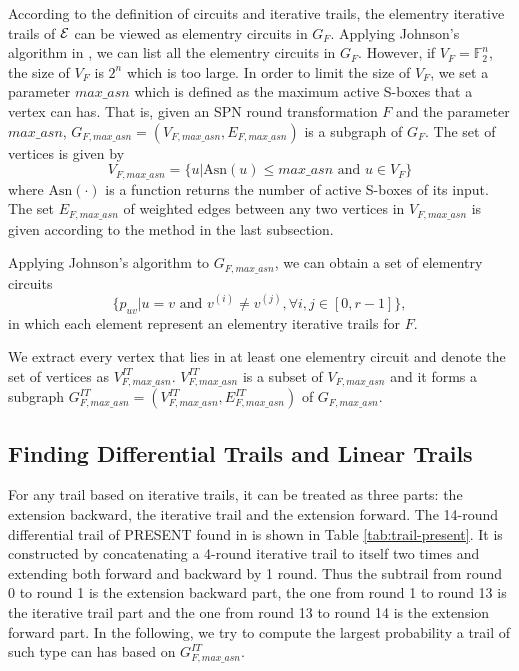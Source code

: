 According to the definition of circuits and iterative trails, the elementry iterative trails of $\mathcal{E}$ can be viewed as elementry circuits in $G_F$. Applying Johnson's algorithm in \cite{J75}, we can list all the elementry circuits in $G_F$. However, if $V_F=\mathbb{F}_2^n$, the size of $V_F$ is $2^n$ which is too large. In order to limit the size of $V_F$, we set a parameter $max\_asn$ which is defined as the maximum active S-boxes that a vertex can has. That is, given an SPN round transformation $F$ and the parameter $max\_asn$, $G_{F,max\_asn}=(V_{F,max\_asn},E_{F,max\_asn})$ is a subgraph of $G_F$. The set of vertices is given by
\[
    V_{F,max\_asn}=\{u|\text{Asn}(u)\leq max\_asn \text{ and } u\in V_F\}
\]
where $\text{Asn}(\cdot)$ is a function returns the number of active S-boxes of its input. The set $E_{F,max\_asn}$ of weighted edges between any two vertices in $V_{F,max\_asn}$ is given according to the method in the last subsection. 

Applying Johnson's algorithm to $G_{F,max\_asn}$, we can obtain a set of elementry circuits
\[
    \{p_{uv}|u=v \text{ and } v^{(i)}\neq v^{(j)},\forall i,j\in[0,r-1]\},
\]
in which each element represent an elementry iterative trails for $F$. 

We extract every vertex that lies in at least one elementry circuit and denote the set of vertices as $V^{IT}_{F,max\_asn}$. $V^{IT}_{F,max\_asn}$ is a subset of $V_{F,max\_asn}$ and it forms a subgraph $G^{IT}_{F,max\_asn}=(V^{IT}_{F,max\_asn},E^{IT}_{F,max\_asn})$ of $G_{F,max\_asn}$. 

\subsection{Finding Differential Trails and Linear Trails\label{subsec:find-trails}}

For any trail based on iterative trails, it can be treated as three parts: the extension backward, the iterative trail and the extension forward. The 14-round differential trail of PRESENT found in \cite{W08} is shown in Table \ref{tab:trail-present}. It is constructed by concatenating a 4-round iterative trail to itself two times and extending both forward and backward by 1 round. Thus the subtrail from round 0 to round 1 is the extension backward part, the one from round 1 to round 13 is the iterative trail part and the one from round 13 to round 14 is the extension forward part. In the following, we try to compute the largest probability a trail of such type can has based on $G^{IT}_{F,max\_asn}$. 

